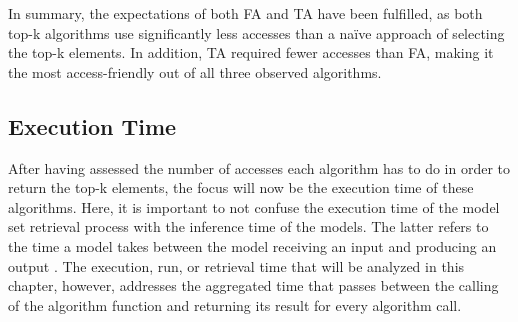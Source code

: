 In summary, the expectations of both FA and TA have been fulfilled, as both top-k algorithms use significantly less accesses than a naïve approach of selecting the top-k elements. In addition, TA required fewer accesses than FA, making it the most access-friendly out of all three observed algorithms. 



\subsection{Execution Time}

After having assessed the number of accesses each algorithm has to do in order to return the top-k elements, the focus will now be the execution time of these algorithms. Here, it is important to not confuse the execution time of the model set retrieval process with the inference time of the models. The latter refers to the time a model takes between the model receiving an input and producing an output \cite{marco2019}. The execution, run, or retrieval time that will be analyzed in this chapter, however, addresses the aggregated time that passes between the calling of the algorithm function and returning its result for every algorithm call. 


